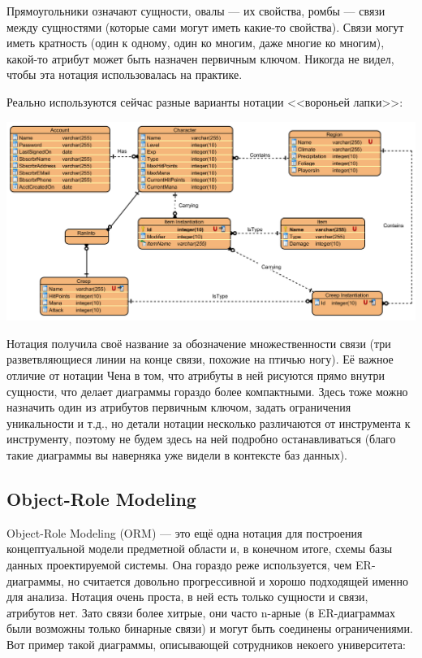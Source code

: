 \documentclass[a5paper]{article}
\begin{document}
Прямоугольники означают сущности, овалы --- их свойства, ромбы --- связи между сущностями (которые сами могут иметь какие-то свойства). Связи могут иметь кратность (один к одному, один ко многим, даже многие ко многим), какой-то атрибут может быть назначен первичным ключом. Никогда не видел, чтобы эта нотация использовалась на практике.

Реально используются сейчас разные варианты нотации <<вороньей лапки>>:

\begin{center}
    \includegraphics[width=\textwidth]{erCrowsFoot.png}
\end{center}

Нотация получила своё название за обозначение множественности связи (три разветвляющиеся линии на конце связи, похожие на птичью ногу). Её важное отличие от нотации Чена в том, что атрибуты в ней рисуются прямо внутри сущности, что делает диаграммы гораздо более компактными. Здесь тоже можно назначить один из атрибутов первичным ключом, задать ограничения уникальности и т.д., но детали нотации несколько различаются от инструмента к инструменту, поэтому не будем здесь на ней подробно останавливаться (благо такие диаграммы вы наверняка уже видели в контексте баз данных).

\subsection{Object-Role Modeling}

Object-Role Modeling (ORM) --- это ещё одна нотация для построения концептуальной модели предметной области и, в конечном итоге, схемы базы данных проектируемой системы. Она гораздо реже используется, чем ER-диаграммы, но считается довольно прогрессивной и хорошо подходящей именно для анализа. Нотация очень проста, в ней есть только сущности и связи, атрибутов нет. Зато связи более хитрые, они часто n-арные (в ER-диаграммах были возможны только бинарные связи) и могут быть соединены ограничениями. Вот пример такой диаграммы, описывающей сотрудников некоего университета:
\end{document}
